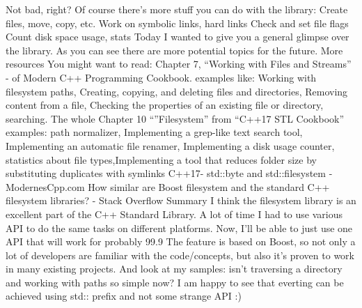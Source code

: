 Not bad, right?
Of course there’s more stuff you can do with the library:
Create files, move, copy, etc.
Work on symbolic links, hard links
Check and set file flags
Count disk space usage, stats
Today I wanted to give you a general glimpse over the library. As you can see there are more potential topics for the future.
More resources
You might want to read:
Chapter 7, “Working with Files and Streams” - of Modern C++ Programming Cookbook. 
examples like: Working with filesystem paths, Creating, copying, and deleting files and directories, Removing content from a file, Checking the properties of an existing file or directory, searching.
The whole Chapter 10 “”Filesystem” from “C++17 STL Cookbook” 
examples: path normalizer, Implementing a grep-like text search tool, Implementing an automatic file renamer, Implementing a disk usage counter, statistics about file types,Implementing a tool that reduces folder size by substituting duplicates with symlinks
C++17- std::byte and std::filesystem - ModernesCpp.com
How similar are Boost filesystem and the standard C++ filesystem libraries? - Stack Overflow
Summary
I think the filesystem library is an excellent part of the C++ Standard Library. A lot of time I had to use various API to do the same tasks on different platforms. Now, I’ll be able to just use one API that will work for probably 99.9%
The feature is based on Boost, so not only a lot of developers are familiar with the code/concepts, but also it’s proven to work in many existing projects.
And look at my samples: isn’t traversing a directory and working with paths so simple now? I am happy to see that everting can be achieved using std:: prefix and not some strange API :)